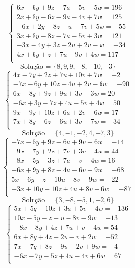 \documentclass[12pt,oneside,a4paper]{article}
\begin{document}
\vspace{\baselineskip}
\begin{equation*}
\begin{cases}
6x-6y+9z-7u-5v-5w=196 \\
2x+8y-6z-9u-4v+7w=125 \\
-6x+2y-8z+u-7v+5w=-55 \\
3x+8y-8z-7u-5v+3w=121 \\
-3x-4y+3z-2u+2v-w=-34 \\
4x+6y+z+7u-9v+4w=117 \\
\end{cases}
\end{equation*}
\begin{equation*}
\text{Solução = }\{8,9,9,-8,-10,-3\}
\end{equation*}
\vspace{\baselineskip}
\begin{equation*}
\begin{cases}
4x-7y+2z+7u+10v+7w=-2 \\
-7x-6y+10z-4u+2v-6w=-90 \\
6x-8y+9z+9u+3v-3w=20 \\
-6x+3y-7z+4u-5v+4w=50 \\
9x-9y+10z+6u+2v-6w=17 \\
7x+8y-6z-6u+3v-7w=-34 \\
\end{cases}
\end{equation*}
\begin{equation*}
\text{Solução = }\{4,-1,-2,4,-7,3\}
\end{equation*}
\vspace{\baselineskip}
\begin{equation*}
\begin{cases}
-7x-5y+9z-6u+9v+6w=-14 \\
-9x-7y+2z+7u+3v+4w=44 \\
-8x-5y-3z+7u-v-4w=16 \\
-6x+9y+8z-4u-6v+9w=-68 \\
5x-6y+z-10u+8v-9w=-22 \\
-3x+10y-10z+4u+8v-6w=-87 \\
\end{cases}
\end{equation*}
\begin{equation*}
\text{Solução = }\{3,-8,-5,1,-2,6\}
\end{equation*}
\vspace{\baselineskip}
\begin{equation*}
\begin{cases}
5x+5y-10z+3u+5v-4w=-136 \\
10x-5y-z-u-8v-9w=-13 \\
-8x-8y+4z+7u+v-4w=54 \\
6x+8y+4z-2u-v+2w=-52 \\
7x-7y+8z+9u-2v+9w=-4 \\
-6x-7y-5z+4u-4v+6w=67 \\
\end{cases}
\end{equation*}
\end{document}
